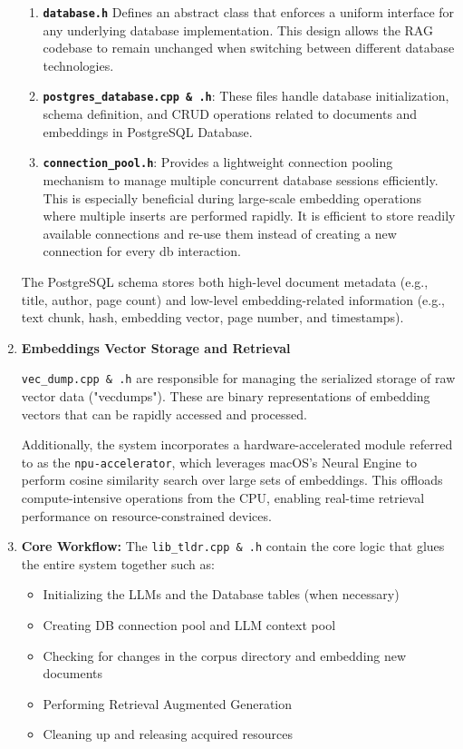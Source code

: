 \begin{enumerate}[label=\Alph*.]
\begin{enumerate}[label=\alph*.]
\item \textbf{\texttt{database.h}}\: Defines an abstract class that enforces a uniform interface for any underlying database implementation. This design allows the RAG codebase to remain unchanged when switching between different database technologies.
    \item \textbf{\texttt{postgres\_database.cpp \& .h}}: These files handle database initialization, schema definition, and CRUD operations related to documents and embeddings in PostgreSQL Database.
    \item \textbf{\texttt{connection\_pool.h}}: Provides a lightweight connection pooling mechanism to manage multiple concurrent database sessions efficiently. This is especially beneficial during large-scale embedding operations where multiple inserts are performed rapidly. It is efficient to store readily available connections and re-use them instead of creating a new connection for every db interaction.
\end{enumerate}

The PostgreSQL schema stores both high-level document metadata (e.g., title, author, page count) and low-level embedding-related information (e.g., text chunk, hash, embedding vector, page number, and timestamps).

\item{\textbf{Embeddings Vector Storage and Retrieval\:}}

\texttt{vec\_dump.cpp \& .h}  are responsible for managing the serialized storage of raw vector data ("vecdumps"). These are binary representations of embedding vectors that can be rapidly accessed and processed.

Additionally, the system incorporates a hardware-accelerated module referred to as the \texttt{npu-accelerator}, which leverages macOS’s Neural Engine to perform cosine similarity search over large sets of embeddings. This offloads compute-intensive operations from the CPU, enabling real-time retrieval performance on resource-constrained devices.

\item{\textbf{Core Workflow:}}
The \texttt{lib\_tldr.cpp \& .h} contain the core logic that glues the entire system together such as:
\begin{itemize}
    \item Initializing the LLMs and the Database tables (when necessary)
    \item Creating DB connection pool and LLM context pool
    \item Checking for changes in the corpus directory and embedding new documents
    \item Performing Retrieval Augmented Generation
    \item Cleaning up and releasing acquired resources
\end{itemize}



\end{enumerate}
